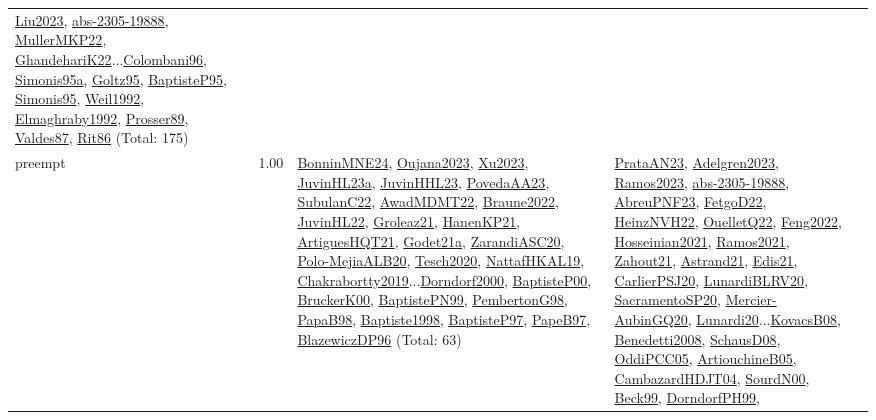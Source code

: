 {\begin{longtable}{p{3cm}r>{\raggedright\arraybackslash}p{6cm}>{\raggedright\arraybackslash}p{6cm}>{\raggedright\arraybackslash}p{8cm}}
\hyperref[detail:Liu2023]{Liu2023}, \hyperref[detail:abs-2305-19888]{abs-2305-19888}, \hyperref[detail:MullerMKP22]{MullerMKP22}, \hyperref[detail:GhandehariK22]{GhandehariK22}...\hyperref[detail:Colombani96]{Colombani96}, \hyperref[detail:Simonis95a]{Simonis95a}, \hyperref[detail:Goltz95]{Goltz95}, \hyperref[detail:BaptisteP95]{BaptisteP95}, \hyperref[detail:Simonis95]{Simonis95}, \hyperref[detail:Weil1992]{Weil1992}, \hyperref[detail:Elmaghraby1992]{Elmaghraby1992}, \hyperref[detail:Prosser89]{Prosser89}, \hyperref[detail:Valdes87]{Valdes87}, \hyperref[detail:Rit86]{Rit86} (Total: 175)\\
\index{preempt}\index{Concepts!preempt}preempt &  1.00 & \hyperref[detail:BonninMNE24]{BonninMNE24}, \hyperref[detail:Oujana2023]{Oujana2023}, \hyperref[detail:Xu2023]{Xu2023}, \hyperref[detail:JuvinHL23a]{JuvinHL23a}, \hyperref[detail:JuvinHHL23]{JuvinHHL23}, \hyperref[detail:PovedaAA23]{PovedaAA23}, \hyperref[detail:SubulanC22]{SubulanC22}, \hyperref[detail:AwadMDMT22]{AwadMDMT22}, \hyperref[detail:Braune2022]{Braune2022}, \hyperref[detail:JuvinHL22]{JuvinHL22}, \hyperref[detail:Groleaz21]{Groleaz21}, \hyperref[detail:HanenKP21]{HanenKP21}, \hyperref[detail:ArtiguesHQT21]{ArtiguesHQT21}, \hyperref[detail:Godet21a]{Godet21a}, \hyperref[detail:ZarandiASC20]{ZarandiASC20}, \hyperref[detail:Polo-MejiaALB20]{Polo-MejiaALB20}, \hyperref[detail:Tesch2020]{Tesch2020}, \hyperref[detail:NattafHKAL19]{NattafHKAL19}, \hyperref[detail:Chakrabortty2019]{Chakrabortty2019}...\hyperref[detail:Dorndorf2000]{Dorndorf2000}, \hyperref[detail:BaptisteP00]{BaptisteP00}, \hyperref[detail:BruckerK00]{BruckerK00}, \hyperref[detail:BaptistePN99]{BaptistePN99}, \hyperref[detail:PembertonG98]{PembertonG98}, \hyperref[detail:PapaB98]{PapaB98}, \hyperref[detail:Baptiste1998]{Baptiste1998}, \hyperref[detail:BaptisteP97]{BaptisteP97}, \hyperref[detail:PapeB97]{PapeB97}, \hyperref[detail:BlazewiczDP96]{BlazewiczDP96} (Total: 63) & \hyperref[detail:PrataAN23]{PrataAN23}, \hyperref[detail:Adelgren2023]{Adelgren2023}, \hyperref[detail:Ramos2023]{Ramos2023}, \hyperref[detail:abs-2305-19888]{abs-2305-19888}, \hyperref[detail:AbreuPNF23]{AbreuPNF23}, \hyperref[detail:FetgoD22]{FetgoD22}, \hyperref[detail:HeinzNVH22]{HeinzNVH22}, \hyperref[detail:OuelletQ22]{OuelletQ22}, \hyperref[detail:Feng2022]{Feng2022}, \hyperref[detail:Hosseinian2021]{Hosseinian2021}, \hyperref[detail:Ramos2021]{Ramos2021}, \hyperref[detail:Zahout21]{Zahout21}, \hyperref[detail:Astrand21]{Astrand21}, \hyperref[detail:Edis21]{Edis21}, \hyperref[detail:CarlierPSJ20]{CarlierPSJ20}, \hyperref[detail:LunardiBLRV20]{LunardiBLRV20}, \hyperref[detail:SacramentoSP20]{SacramentoSP20}, \hyperref[detail:Mercier-AubinGQ20]{Mercier-AubinGQ20}, \hyperref[detail:Lunardi20]{Lunardi20}...\hyperref[detail:KovacsB08]{KovacsB08}, \hyperref[detail:Benedetti2008]{Benedetti2008}, \hyperref[detail:SchausD08]{SchausD08}, \hyperref[detail:OddiPCC05]{OddiPCC05}, \hyperref[detail:ArtiouchineB05]{ArtiouchineB05}, \hyperref[detail:CambazardHDJT04]{CambazardHDJT04}, \hyperref[detail:SourdN00]{SourdN00}, \hyperref[detail:Beck99]{Beck99}, \hyperref[detail:DorndorfPH99]{DorndorfPH99}, 
\end{longtable}}

